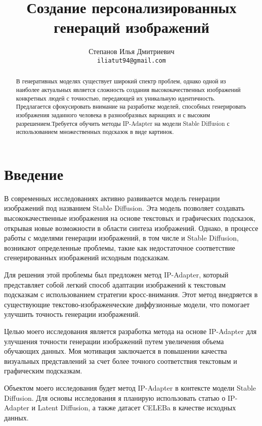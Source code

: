 \documentclass{article}
\title{Создание персонализированных генераций изображений}
\author{Степанов Илья Дмитриевич \\
	\texttt{iliatut94@gmail.com} \\
}
\date{}
\begin{document}
\maketitle

\begin{abstract}
        В генеративных моделях существует широкий спектр проблем, однако одной из наиболее актуальных является сложность создания высококачественных изображений конкретных людей с точностью, передающей их уникальную идентичность. Предлагается сфокусировать внимание на разработке моделей, способных генерировать изображения заданного человека в разнообразных вариациях и с высоким разрешением.Требуется обучить методы IP-Adapter на модели Stable Diffusion с использованием множественных подсказок в виде картинок.
\end{abstract}



\section{Введение}

В современных исследованиях активно развивается модель генерации изображений под названием Stable Diffusion. Эта модель позволяет создавать высококачественные изображения на основе текстовых и графических подсказок, открывая новые возможности в области синтеза изображений. Однако, в процессе работы с моделями генерации изображений, в том числе и Stable Diffusion, возникают определенные проблемы, такие как недостаточное соответствие сгенерированных изображений исходным подсказкам.

Для решения этой проблемы был предложен метод IP-Adapter, который представляет собой легкий способ адаптации изображений к текстовым подсказкам с использованием стратегии кросс-внимания. Этот метод внедряется в существующие текстово-изображенческие диффузионные модели, что помогает улучшить точность генерации изображений.

Целью моего исследования является разработка метода на основе IP-Adapter для улучшения точности генерации изображений путем увеличения объема обучающих данных. Моя мотивация заключается в повышении качества визуальных представлений за счет более точного соответствия текстовым и графическим подсказкам.

Объектом моего исследования будет метод IP-Adapter в контексте модели Stable Diffusion. Для основы исследования я планирую использовать статью о IP-Adapter и Latent Diffusion, а также датасет CELEBa в качестве исходных данных.
\end{document}
